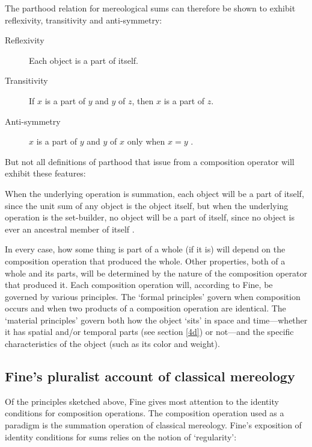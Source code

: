 \documentclass[11pt]{article}
\newenvironment{squote}{%
\begin{spacing}{1}
\begin{list}{}{%
\setlength{\labelwidth}{0pt}%
\rightmargin\leftmargin%
}
\item\relax
}{%
\end{list}%
\end{spacing}
}
\begin{document}
\begin{spacing}{1.5}
The parthood relation for mereological sums can therefore be shown to
exhibit reflexivity, transitivity and anti-symmetry:

\begin{description}
\item[Reflexivity] Each object is a part of itself.
\item[Transitivity] If $x$ is a part of $y$ and $y$ of $z$, then $x$
  is a part of $z$.
\item[Anti-symmetry] $x$ is a part of $y$ and $y$ of $x$ only when $x
  = y$ \citep[568]{fine2010}.
\end{description}

But not all definitions of parthood that issue from a composition
operator will exhibit these features:

\begin{squote}
When the underlying operation is summation, each object will be a part
of itself, since the unit sum of any object is the object itself, but
when the underlying operation is the set-builder, no object will be a
part of itself, since no object is ever an ancestral member of itself
\citep[569]{fine2010}.
\end{squote}

In every case, how some thing is part of a whole (if it is) will
depend on the composition operation that produced the whole.  Other
properties, both of a whole and its parts, will be determined by the
nature of the composition operator that produced it.  Each composition
operation will, according to Fine, be governed by various principles.
The `formal principles' govern when composition occurs and when two
products of a composition operation are identical.  The `material
principles' govern both how the object `sits' in space and
time---whether it has spatial and/or temporal parts (see section
\ref{4d}) or not---and the specific characteristics of the object
(such as its color and weight).

\subsection{Fine's pluralist account of classical mereology}
\label{classical}
Of the principles sketched above, Fine gives most attention to the
identity conditions for composition operations.  The composition
operation used as a paradigm is the summation operation of classical
mereology.  Fine's exposition of identity conditions for sums relies
on the notion of `regularity':


\end{spacing}
\end{document}
